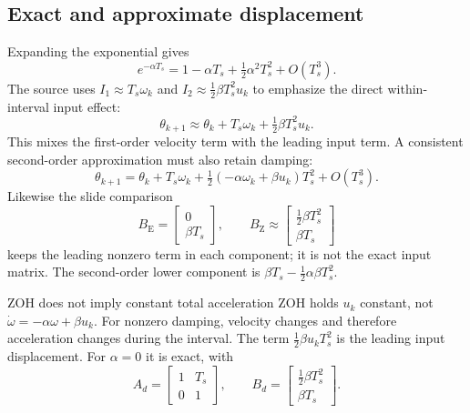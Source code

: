 \documentclass[11pt,a4paper]{article}
\numberwithin{equation}{section}
\numberwithin{figure}{section}
\numberwithin{table}{section}
\begin{document}
\subsection{Exact and approximate displacement}
Expanding the exponential gives
\[e^{-\alpha T_s}=1-\alpha T_s+\tfrac12\alpha^2T_s^2+O(T_s^3).\]
The source uses $I_1\approx T_s\omega_k$ and $I_2\approx\tfrac12\beta T_s^2u_k$ to emphasize the direct within-interval input effect:
\[\theta_{k+1}\approx\theta_k+T_s\omega_k+\tfrac12\beta T_s^2u_k.\]
This mixes the first-order velocity term with the leading input term. A consistent second-order approximation must also retain damping:
\begin{equation}\label{eq:motortaylor}
\theta_{k+1}=\theta_k+T_s\omega_k+\tfrac12(-\alpha\omega_k+\beta u_k)T_s^2+O(T_s^3).
\end{equation}
Likewise the slide comparison
\[B_{\mathrm E}=\begin{bmatrix}0\\\beta T_s\end{bmatrix},\qquad
B_{\mathrm Z}\approx\begin{bmatrix}\frac12\beta T_s^2\\\beta T_s\end{bmatrix}\]
keeps the leading nonzero term in each component; it is not the exact input matrix. The second-order lower component is $\beta T_s-\tfrac12\alpha\beta T_s^2$.

\begin{sourcecorrection}{ZOH does not imply constant total acceleration}
ZOH holds $u_k$ constant, not $\dot\omega=-\alpha\omega+\beta u_k$. For nonzero damping, velocity changes and therefore acceleration changes during the interval. The term $\tfrac12\beta u_kT_s^2$ is the leading input displacement. For $\alpha=0$ it is exact, with
\[A_d=\begin{bmatrix}1&T_s\\0&1\end{bmatrix},\qquad B_d=\begin{bmatrix}\frac12\beta T_s^2\\\beta T_s\end{bmatrix}.\]
\end{sourcecorrection}
\end{document}
